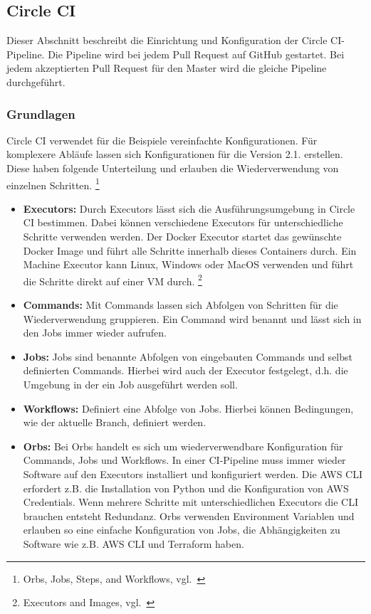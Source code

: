 \newpage
\subsection{Circle CI}\label{implementierung_circle_ci}

Dieser Abschnitt beschreibt die Einrichtung und Konfiguration der Circle CI-Pipeline.
Die Pipeline wird bei jedem Pull Request auf GitHub gestartet.
Bei jedem akzeptierten Pull Request für den Master wird die gleiche Pipeline durchgeführt.

\subsubsection{Grundlagen}

Circle CI verwendet für die Beispiele vereinfachte Konfigurationen.
Für komplexere Abläufe lassen sich Konfigurationen für die Version 2.1. erstellen.
Diese haben folgende Unterteilung und erlauben die Wiederverwendung von einzelnen Schritten.
\footnote{{Orbs, Jobs, Steps, and Workflows, vgl.~\cite{CIRCLE_ORBS_JOBS_STEPS_WORKFLOWS}}}

\begin{itemize}
  \item \textbf{Executors:}
  Durch Executors lässt sich die Ausführungsumgebung in Circle CI bestimmen.
  Dabei können verschiedene Executors für unterschiedliche Schritte verwenden werden.
  Der Docker Executor startet das gewünschte Docker Image und führt alle Schritte innerhalb dieses Containers durch.
  Ein Machine Executor kann Linux, Windows oder MacOS verwenden und führt die Schritte direkt auf einer VM durch.
  \footnote{{Executors and Images, vgl.~\cite{CIRCLE_EXECUTORS_INTRO}}}

  \item \textbf{Commands:}
  Mit Commands lassen sich Abfolgen von Schritten für die Wiederverwendung gruppieren.
  Ein Command wird benannt und lässt sich in den Jobs immer wieder aufrufen.

  \item \textbf{Jobs:}
  Jobs sind benannte Abfolgen von eingebauten Commands und selbst definierten Commands.
  Hierbei wird auch der Executor festgelegt, d.h. die Umgebung in der ein Job ausgeführt werden soll.

  \item \textbf{Workflows:}
  Definiert eine Abfolge von Jobs.
  Hierbei können Bedingungen, wie der aktuelle Branch, definiert werden.

  \item \textbf{Orbs:}
  Bei Orbs handelt es sich um wiederverwendbare Konfiguration für Commands, Jobs und Workflows.
  In einer CI-Pipeline muss immer wieder Software auf den Executors installiert und konfiguriert werden.
  Die AWS CLI erfordert z.B. die Installation von Python und die Konfiguration von AWS Credentials.
  Wenn mehrere Schritte mit unterschiedlichen Executors die CLI brauchen entsteht Redundanz.
  Orbs verwenden Environment Variablen und erlauben so eine einfache Konfiguration von Jobs, die Abhängigkeiten zu Software wie z.B. AWS CLI und Terraform haben.
\end{itemize}

